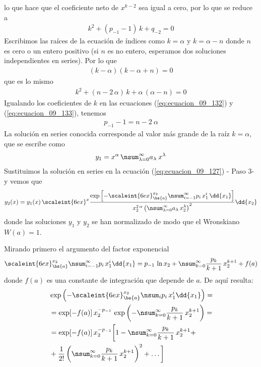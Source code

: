 lo que hace que el coeficiente neto de $x^{k-2}$ sea igual a cero, por lo que se reduce a
\begin{align}
k^{2} + (p_{-1} - 1) \, k + q_{-2} = 0
\label{eq:ecuacion_09_132}
\end{align}
Escribimos las raíces de la ecuación de índices como $k = \alpha$ y $k= \alpha - n$ donde $n$ es cero o un entero positivo (si $n$ es no entero, esperamos dos soluciones independientes en series). Por lo que
\begin{align}
(k - \alpha)(k - \alpha + n) = 0
\label{eq:ecuacion_09_133}
\end{align}
que es lo mismo
\begin{align*}
k^{2} + (n - 2 \, \alpha) \, k + \alpha \, (\alpha - n) = 0
\end{align*}
Igualando los coeficientes de $k$ en las ecuaciones (\ref{eq:ecuacion_09_132}) y (\ref{eq:ecuacion_09_133}), tenemos
\begin{align}
p_{-1} -1 = n - 2 \: \alpha
\label{eq:ecuacion_09_134}
\end{align}
La solución en series conocida corresponde al valor más grande de la raíz $k = \alpha$, que se escribe como
\begin{align*}
y_{1} =  x^{\alpha} \, \nsum_{\lambda=0}^{\infty} a_{\lambda} \: x^{\lambda}
\end{align*}
Sustituimos la solución en series en la ecuación (\ref{eq:ecuacion_09_127}) - Paso 3- y vemos que
\begin{align}
y_{2} (x) = y_{1} (x) \, \scaleint{6ex}^{x} \dfrac{\exp \left[ \displaystyle - \scaleint{6ex}_{\bs {a}}^{x_{2}} \nsum_{i=-1}^{\infty} p_{i} \, x^{i}_{1} \, \dd{x_{1}} \right] }{x_{2}^{2 \, \alpha} \left( \displaystyle \nsum_{\lambda=0}^\infty a_{\lambda} \, x_{2}^{\lambda} \right)^{2} } \dd{x_{2}}
\label{eq:ecuacion_09_135}
\end{align}
donde las soluciones $y_{1}$ y $y_{2}$ se han normalizado de modo que el Wronskiano $W(a) = 1$. 
\par
Mirando primero el argumento del factor exponencial
\begin{align}
\scaleint{6ex}_{\bs {a}}^{x_{2}} \nsum_{i=-1}^{\infty} p_{i} \, x_{1}^{i} \dd{x_{1}} = p_{-1} \, \ln x_{2} + \nsum_{k=0}^{\infty} \dfrac{p_{k}}{k + 1} \, x_{2}^{k + 1} + f (a)
\label{eq:ecuacion_09_136}
\end{align}
donde $f (a)$ es una constante de integración que depende de $a$. De aquí resulta:
\begin{align}
\begin{aligned}[b]
&{}\exp \left( - \scaleint{6ex}_{\bs {a}}^{x_{2}} \nsum_{i} p_{i} \, x_{1}^{i} \dd{x_{1}} \right) =  \\
&= \exp [ - f (a) ] \, x_{2}^{-p_{-1}} \, \exp \left( - \nsum_{k=0}^{\infty} \dfrac{p_{k}}{k+1} \, x_{2}^{k+1} \right) = \\
&= \exp [ - f (a) ] \, x_{2}^{-p_{-1}} \bigg[ 1 - \nsum_{k=0}^{\infty} \dfrac{p_{k}}{k+1} \, x_{2}^{k+1} + \\
&+ \dfrac{1}{2!} \left( \nsum_{k=0}^{\infty} \dfrac{p_{k}}{k+1} \, x_{2}^{k+1} \right)^{2} + \ldots \bigg]
\end{aligned}
\label{eq:ecuacion_09_137}
\end{align}
